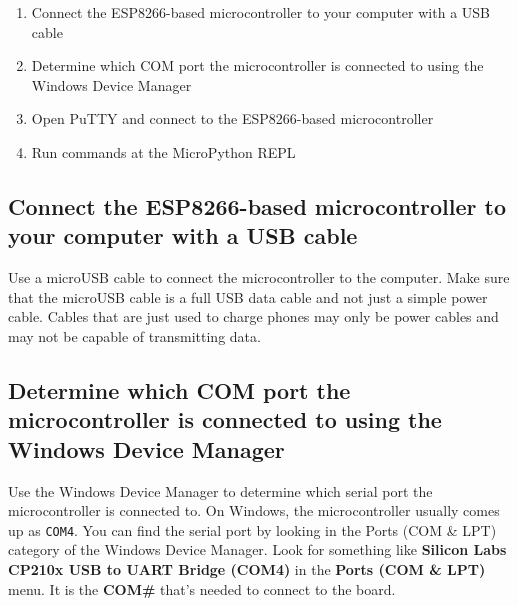 \documentclass{book}
\providecommand{\tightlist}{%
      \setlength{\itemsep}{0pt}\setlength{\parskip}{0pt}}
\newcommand{\passthrough}[1]{#1}
\begin{document}
    
        \begin{enumerate}
\def\labelenumi{\arabic{enumi}.}
\tightlist
\item
  Connect the ESP8266-based microcontroller to your computer with a USB
  cable
\item
  Determine which COM port the microcontroller is connected to using the
  Windows Device Manager
\item
  Open PuTTY and connect to the ESP8266-based microcontroller
\item
  Run commands at the MicroPython REPL
\end{enumerate}
    




    
        \hypertarget{connect-the-esp8266-based-microcontroller-to-your-computer-with-a-usb-cable}{%
\subsection{Connect the ESP8266-based microcontroller to your computer
with a USB
cable}\label{connect-the-esp8266-based-microcontroller-to-your-computer-with-a-usb-cable}}
    




    
        Use a microUSB cable to connect the microcontroller to the computer.
Make sure that the microUSB cable is a full USB data cable and not just
a simple power cable. Cables that are just used to charge phones may
only be power cables and may not be capable of transmitting data.
    




    
        \hypertarget{determine-which-com-port-the-microcontroller-is-connected-to-using-the-windows-device-manager}{%
\subsection{Determine which COM port the microcontroller is connected to
using the Windows Device
Manager}\label{determine-which-com-port-the-microcontroller-is-connected-to-using-the-windows-device-manager}}
    




    
        Use the Windows Device Manager to determine which serial port the
microcontroller is connected to. On Windows, the microcontroller usually
comes up as \passthrough{\lstinline!COM4!}. You can find the serial port
by looking in the Ports (COM \& LPT) category of the Windows Device
Manager. Look for something like \textbf{Silicon Labs CP210x USB to UART
Bridge (COM4)} in the \textbf{Ports (COM \& LPT)} menu. It is the
\textbf{COM\#} that's needed to connect to the board.
\end{document}
